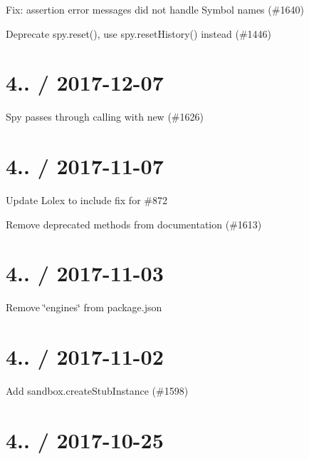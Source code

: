 \begin{DoxyItemize}
\item Fix\+: assertion error messages did not handle Symbol names (\#1640)
\item Deprecate spy.\+reset(), use spy.\+reset\+History() instead (\#1446)
\end{DoxyItemize}

\section*{4.. / 2017-\/12-\/07 }


\begin{DoxyItemize}
\item Spy passes through calling with {\ttfamily new} (\#1626)
\end{DoxyItemize}

\section*{4.. / 2017-\/11-\/07 }


\begin{DoxyItemize}
\item Update Lolex to include fix for \#872
\item Remove deprecated methods from documentation (\#1613)
\end{DoxyItemize}

\section*{4.. / 2017-\/11-\/03 }


\begin{DoxyItemize}
\item Remove \char`\"{}engines\char`\"{} from package.\+json
\end{DoxyItemize}

\section*{4.. / 2017-\/11-\/02 }


\begin{DoxyItemize}
\item Add sandbox.\+create\+Stub\+Instance (\#1598)
\end{DoxyItemize}

\section*{4.. / 2017-\/10-\/25 }


